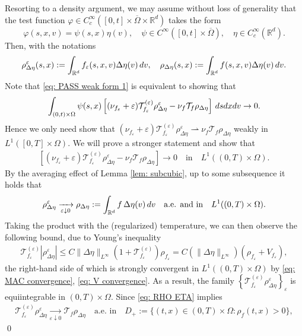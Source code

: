 \documentclass[10pt,a4paper]{amsart}
\newcommand{\R}{\mathbb{R}}
\newcommand{\calT}{\mathcal T}
\newcommand{\ds}{\textnormal{d}s}
\newcommand{\dv}{\textnormal{d}v}
\newcommand{\dx}{\textnormal{d}x}
\newcommand{\intr}{\int_{\R^d}}
\newcommand{\lt}{\left}
\renewenvironment{proof}[1][\proofname]{\noindent{\scshape #1.\quad}}{\qed}
\newcommand{\rt}{\right}
\newcommand{\ve}{\varepsilon}
\newcommand{\weakto}{\rightharpoonup}
\begin{document}
\begin{proof}
Resorting to a density argument, we may assume without loss of generality that the test function $\varphi\in C_c^\infty([0,t]\times\overline\Omega\times\R^d)$ takes the form
\[
    \varphi(s,x,v) = \psi(s,x) \eta(v), \quad \psi\in C^\infty([0,t]\times \overline{\Omega}), \quad \eta\in C_c^\infty(\R^d).
\]
Then, with the notations
\[
 \rho_{\Delta\eta}^\ve(s,x) := \intr f_\ve(s,x,v) \Delta\eta(v) \,\dv, \quad \rho_{\Delta\eta}(s,x) := \intr f(s,x,v) \Delta\eta(v)\,\dv.
\]
Note that \eqref{eq: PASS weak form 1} is equivalent to showing that
\begin{align} \label{eq: PASS weak form 1, EQUIV}
    \int_{(0,t)\times \Omega} \psi(s,x) \lt[ (\nu_{f_\ve} + \ve) \calT_{f_\ve}^{(\ve)} \rho_{\Delta\eta}^\ve - \nu_f \calT_f \rho_{\Delta\eta} \rt] \,\ds\dx\dv \to 0.
\end{align}
Hence we only need show that $(\nu_{f_\ve} + \ve) \calT_{f_\ve}^{(\ve)} \rho_{\Delta\eta}^\ve \weakto \nu_f \calT_f \rho_{\Delta\eta}$ weakly in $L^1([0,T]\times \Omega)$. We will prove a stronger statement and show that
\begin{align}\label{eq: stronger}
     \lt[ (\nu_{f_\ve} + \ve) \calT_{f_\ve}^{(\ve)} \rho_{\Delta\eta}^\ve - \nu_f \calT_f \rho_{\Delta\eta} \rt] \to 0 \quad \text{in} \quad L^1((0,T)\times\Omega).
\end{align}
By the averaging effect of Lemma \ref{lem: subcubic}, up to some subsequence it holds that
\begin{align} \label{eq: RHO ETA}
    \rho_{\Delta\eta}^\ve \xrightarrow[\ve\downarrow 0]{} \rho_{\Delta\eta} := \intr f\,\Delta\eta(v)\,\dv \quad \text{a.e. and in} \quad L^1((0,T)\times\Omega).
\end{align}
Taking the product with the (regularized) temperature, we can then observe the following bound, due to Young's inequality
\begin{align}\label{eq: eta YOUNG}
    \calT_{f_\ve}^{(\ve)} |\rho_{\Delta\eta}^\ve| \le C \|\Delta\eta\|_{L^\infty} \lt(1 + \calT_{f_\ve}^{(\ve)}\rt)  \rho_{f_\ve} = C(\|\Delta\eta\|_{L^\infty}) (\rho_{f_\ve} + V_{f_\ve}),
\end{align}
the right-hand side of which is strongly convergent in $L^1((0,T)\times\Omega)$ by \eqref{eq: MAC convergence}, \eqref{eq: V convergence}. As a result, the family $\lt\{\calT_{f_\ve}^{(\ve)} \rho_{\Delta\eta}^\ve \rt\}_\ve$ is equiintegrable in $(0,T)\times\Omega$. Since \eqref{eq: RHO ETA} implies
\begin{align*}
    \calT_{f_\ve}^{(\ve)} \rho_{\Delta\eta}^\ve \xrightarrow[\ve\downarrow 0]{} \calT_f \rho_{\Delta\eta} \quad \text{a.e. in}\quad D_+ := \{(t,x)\in (0,T)\times\Omega: \rho_f(t,x)>0\},

\end{align*}
\end{proof}
\end{document}
